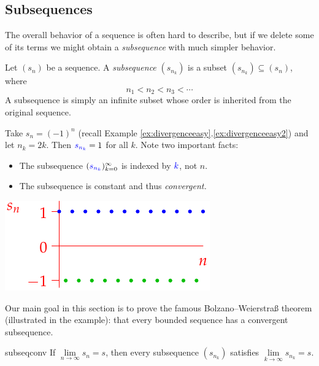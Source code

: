 \clearpage



\subsection{Subsequences}\label{sec:subseq}

The overall behavior of a sequence is often hard to describe, but if we delete some of its terms we might obtain a \emph{subsequence} with much simpler behavior.

\begin{defn}{}{}
	Let $(s_n)$ be a sequence. A \emph{subsequence} $(s_{n_k})$ is a subset $(s_{n_k})\subseteq (s_n)$, where 
	\[
		n_1<n_2<n_3<\cdots
	\]
	A subsequence is simply an infinite subset whose order is inherited from the original sequence.
\end{defn}

\begin{example}[lower separated=false, sidebyside, sidebyside align=top seam, sidebyside gap=0pt, righthand width=0.38\linewidth]{}{}
	Take $s_n=(-1)^n$ (recall Example \ref*{ex:divergenceeasy}.\ref{ex:divergenceeasy2}) and let $n_k=2k$. Then $\textcolor{blue}{s_{n_k}}=1$ for all $k$. Note two important facts:
	\begin{itemize}
	  \item The subsequence $(\textcolor{blue}{s_{n_k}})_{k=0}^\infty$ is indexed by $\textcolor{blue}{k}$, not $n$.
	  \item The subsequence is constant and thus \emph{convergent.}
	\end{itemize} 
	\tcblower
	\hfill\includegraphics{divergent3}
\end{example}

Our main goal in this section is to prove the famous Bolzano--Weierstraß theorem (illustrated in the example): that every bounded sequence has a convergent subsequence.


\begin{lemm}{}{subseqconv}
	If $\lim\limits_{n\to\infty} s_n=s$, then every subsequence $(s_{n_k})$ satisfies $\lim\limits_{k\to\infty} s_{n_k}=s$.
\end{lemm}

